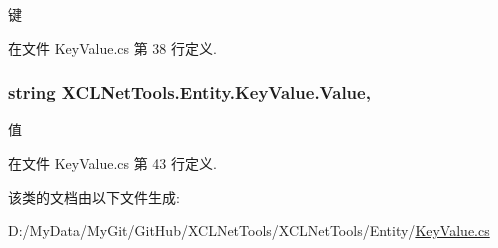 键 



在文件 Key\-Value.\-cs 第 38 行定义.

\hypertarget{class_x_c_l_net_tools_1_1_entity_1_1_key_value_a9ec3c76143930f64c1e0de2074514bae}{
\subsubsection[{Value}]{\setlength{\rightskip}{0pt plus 5cm}string X\-C\-L\-Net\-Tools.\-Entity.\-Key\-Value.\-Value\hspace{0.3cm}{\ttfamily [get]}, {\ttfamily [set]}}}\label{class_x_c_l_net_tools_1_1_entity_1_1_key_value_a9ec3c76143930f64c1e0de2074514bae}


值 



在文件 Key\-Value.\-cs 第 43 行定义.



该类的文档由以下文件生成\-:\begin{DoxyCompactItemize}
\item 
D\-:/\-My\-Data/\-My\-Git/\-Git\-Hub/\-X\-C\-L\-Net\-Tools/\-X\-C\-L\-Net\-Tools/\-Entity/\hyperlink{_key_value_8cs}{Key\-Value.\-cs}\end{DoxyCompactItemize}

